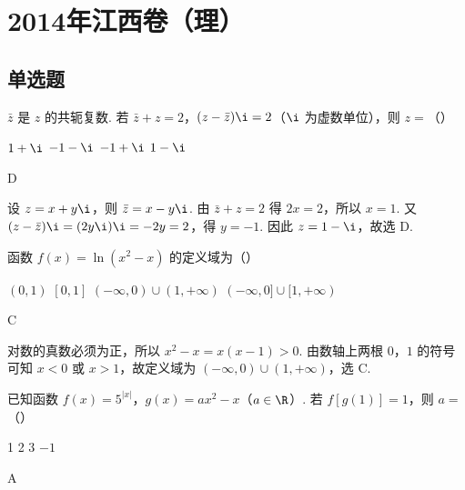 \chapter{2014年江西卷（理）}

\section{单选题}

\begin{problem}
\( \bar{z} \) 是 \( z \) 的共轭复数. 若 \(\bar{z} + z = 2\)，\((z - \bar{z})\i = 2\)（\(\i\) 为虚数单位），则 \( z = \)（\quad）

\choices
    {\(1 + \i\)}
    {\(-1 - \i\)}
    {\(-1 + \i\)}
    {\(1 - \i\)}
\end{problem}

\begin{answer}
D
\end{answer}

\begin{solution}
设 \(z=x+y\i\)，则 \(\bar z=x-y\i\). 由 \(\bar z+z=2\) 得 \(2x=2\)，所以 \(x=1\). 又
\((z-\bar z)\i=(2y\i)\i=-2y=2\)，得 \(y=-1\). 因此 \(z=1-\i\)，故选 D.
\end{solution}

\begin{problem}
函数 \( f(x) = \ln (x^2 - x) \) 的定义域为（\quad）

\choices
    {\((0,1)\)}
    {\([0,1]\)}
    {\((-\infty, 0) \cup (1, +\infty)\)}
    {\((-\infty, 0] \cup [1, +\infty)\)}
\end{problem}

\begin{answer}
C
\end{answer}

\begin{solution}
对数的真数必须为正，所以 \(x^2-x=x(x-1)>0\). 由数轴上两根 \(0\)，\(1\) 的符号可知 \(x<0\) 或 \(x>1\)，故定义域为 \((-\infty,0)\cup(1,+\infty)\)，选 C.
\end{solution}

\begin{problem}
已知函数 \( f(x) = 5^{|x|} \)，\( g(x) = ax^{2} - x \)（\(a \in \R\)）. 若 \( f[g(1)] = 1 \)，则 \( a = \)（\quad）

\choices
    {1}
    {2}
    {3}
    {\(-1\)}
\end{problem}

\begin{answer}
A
\end{answer}

